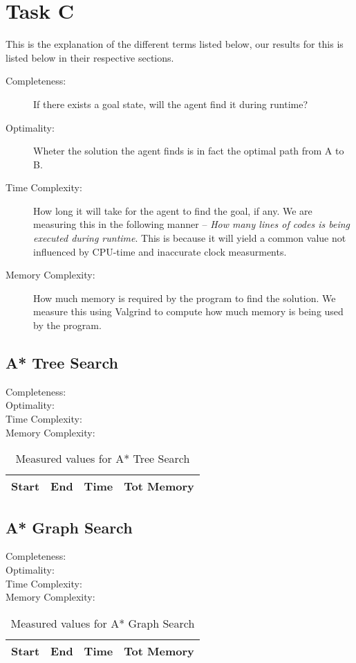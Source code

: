 
\chapter{Task C}
This is the explanation of the different terms listed below, our results for
this is listed below in their respective sections.
\begin{description}
\item[Completeness:			]
	If there exists a goal state, will the agent find it during runtime?
\item[Optimality:				]
	Wheter the solution the agent finds is in fact the optimal path from A to B.
\item[Time Complexity:	]
	How long it will take for the agent to find the goal, if any.  We are
	measuring this in the following manner -- \textit{How many lines of codes is
	being executed during runtime}.  This is because it will yield a common value
	not influenced by CPU-time and inaccurate clock measurments.
\item[Memory Complexity:]
	How much memory is required by the program to find the solution. We measure
	this using Valgrind to compute how much memory is being used by the program.
\end{description}

\section{A* Tree Search}
\begin{description}
\item[Completeness:			]
\item[Optimality:				]
\item[Time Complexity:	]
\item[Memory Complexity:]
\end{description}

\begin{table}[h]
\centering
\begin{tabular}{	p{} p{} 
									p{} p{} }\hline
	Start & End & Time & Tot Memory \\\hline
\end{tabular}
\caption{Measured values for A* Tree Search}\label{tbl:sumTree}
\end{table}

\section{A* Graph Search}
\begin{description}
\item[Completeness:			]
\item[Optimality:				]
\item[Time Complexity:	]
\item[Memory Complexity:]
\end{description}

\begin{table}[h]
\centering
\begin{tabular}{	p{} p{} 
									p{} p{} }\hline
	Start & End & Time & Tot Memory \\\hline
\end{tabular}
\caption{Measured values for A* Graph Search}\label{tbl:sumGraph}
\end{table}




